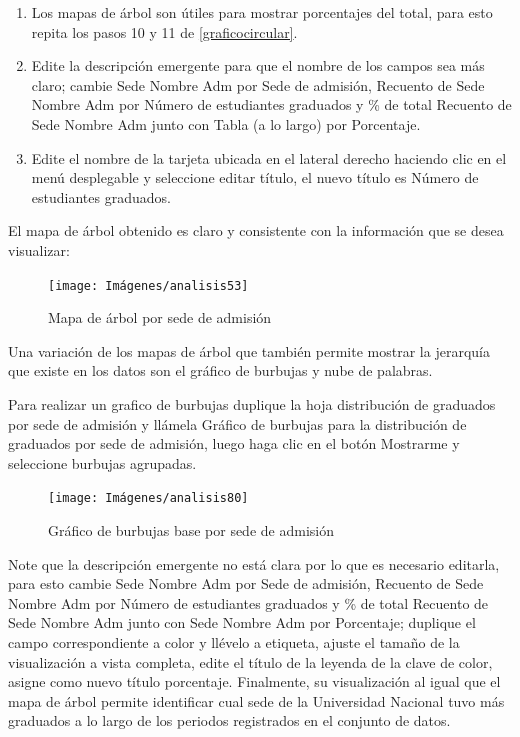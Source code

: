 \documentclass[
]{book}
\begin{document}
\begin{enumerate}
\def\labelenumi{\arabic{enumi}.}
\setcounter{enumi}{5}
\item
  Los mapas de árbol son útiles para mostrar porcentajes del total, para esto repita los pasos 10 y 11 de \ref{graficocircular}.
\item
  Edite la descripción emergente para que el nombre de los campos sea más claro; cambie Sede Nombre Adm por Sede de admisión, Recuento de Sede Nombre Adm por Número de estudiantes graduados y \% de total Recuento de Sede Nombre Adm junto con Tabla (a lo largo) por Porcentaje.
\item
  Edite el nombre de la tarjeta ubicada en el lateral derecho haciendo clic en el menú desplegable y seleccione editar título, el nuevo título es Número de estudiantes graduados.
\end{enumerate}

El mapa de árbol obtenido es claro y consistente con la información que se desea visualizar:

\begin{figure}

{\centering \texttt{[image: Imágenes/analisis53]} 

}

\caption{Mapa de árbol por sede de admisión}\label{fig:mapaarbol-fig}
\end{figure}

Una variación de los mapas de árbol que también permite mostrar la jerarquía que existe en los datos son el gráfico de burbujas y nube de palabras.

Para realizar un grafico de burbujas duplique la hoja distribución de graduados por sede de admisión y llámela Gráfico de burbujas para la distribución de graduados por sede de admisión, luego haga clic en el botón Mostrarme y seleccione burbujas agrupadas.

\begin{figure}

{\centering \texttt{[image: Imágenes/analisis80]} 

}

\caption{Gráfico de burbujas base por sede de admisión}\label{fig:1burbujas-fig}
\end{figure}

Note que la descripción emergente no está clara por lo que es necesario editarla, para esto cambie Sede Nombre Adm por Sede de admisión, Recuento de Sede Nombre Adm por Número de estudiantes graduados y \% de total Recuento de Sede Nombre Adm junto con Sede Nombre Adm por Porcentaje; duplique el campo correspondiente a color y llévelo a etiqueta, ajuste el tamaño de la visualización a vista completa, edite el título de la leyenda de la clave de color, asigne como nuevo título porcentaje. Finalmente, su visualización al igual que el mapa de árbol permite identificar cual sede de la Universidad Nacional tuvo más graduados a lo largo de los periodos registrados en el conjunto de datos.
\end{document}
